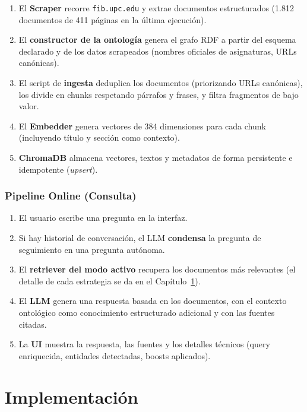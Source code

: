 \documentclass[12pt, a4paper, twoside]{report}
\begin{document}
\begin{enumerate}
  \item El \textbf{Scraper} recorre \texttt{fib.upc.edu} y extrae documentos estructurados (1.812 documentos de 411 p\'aginas en la \'ultima ejecuci\'on).
  \item El \textbf{constructor de la ontolog\'ia} genera el grafo RDF a partir del esquema declarado y de los datos scrapeados (nombres oficiales de asignaturas, URLs can\'onicas).
  \item El script de \textbf{ingesta} deduplica los documentos (priorizando URLs can\'onicas), los divide en chunks respetando p\'arrafos y frases, y filtra fragmentos de bajo valor.
  \item El \textbf{Embedder} genera vectores de 384 dimensiones para cada chunk (incluyendo t\'itulo y secci\'on como contexto).
  \item \textbf{ChromaDB} almacena vectores, textos y metadatos de forma persistente e idempotente (\textit{upsert}).
\end{enumerate}

\subsection{Pipeline Online (Consulta)}

\begin{enumerate}
  \item El usuario escribe una pregunta en la interfaz.
  \item Si hay historial de conversaci\'on, el LLM \textbf{condensa} la pregunta de seguimiento en una pregunta aut\'onoma.
  \item El \textbf{retriever del modo activo} recupera los documentos m\'as relevantes (el detalle de cada estrategia se da en el Cap\'itulo~\ref{ch:implementacion}).
  \item El \textbf{LLM} genera una respuesta basada en los documentos, con el contexto ontol\'ogico como conocimiento estructurado adicional y con las fuentes citadas.
  \item La \textbf{UI} muestra la respuesta, las fuentes y los detalles t\'ecnicos (query enriquecida, entidades detectadas, boosts aplicados).
\end{enumerate}

\chapter{Implementaci\'on}
\label{ch:implementacion}
\end{document}
